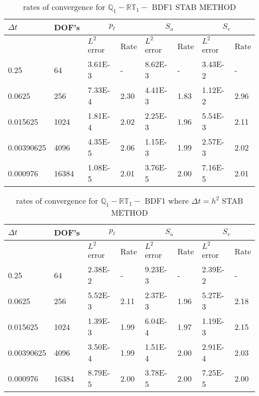 \begin{table}[ht]
	\centering
	\begin{tabular}{|l|l|l|l|l|l|l|l|}
		\hline
		$\Delta t$ & DOF's & \multicolumn{2}{c|}{$p_{\ell}$} & \multicolumn{2}{c|}{$S_a$} & \multicolumn{2}{c|}{$S_v$}  \\ \hline
		& & $L^2$ error & Rate & $L^2$ error & Rate & $L^2$ error & Rate \\ \hline
		0.25   	  & 64    & 3.61E-3 & -	   & 8.62E-3 & -    & 3.43E-2 & - \\ \hline
		0.0625    & 256   & 7.33E-4 & 2.30 & 4.41E-3 & 1.83 & 1.12E-2 & 2.96 \\ \hline
		0.015625  & 1024  & 1.81E-4 & 2.02 & 2.25E-3 & 1.96 & 5.54E-3 & 2.11 \\ \hline
		0.00390625& 4096  & 4.35E-5 & 2.06 & 1.15E-3 & 1.99 & 2.57E-3 & 2.02 \\ \hline 
		0.000976  & 16384 & 1.08E-5 & 2.01 & 3.76E-5 & 2.00 & 7.16E-5 & 2.01  \\ \hline
	\end{tabular}
	\caption[Template table-description for list of tables.]{ rates of convergence for $\mathbb{Q}_1 - \mathbb{RT}_1 -$ BDF1  STAB METHOD }
\end{table}


\begin{table}[ht]
	\centering
	\begin{tabular}{|l|l|l|l|l|l|l|l|}
		\hline
		$\Delta t$ & DOF's & \multicolumn{2}{c|}{$p_{\ell}$} & \multicolumn{2}{c|}{$S_a$} & \multicolumn{2}{c|}{$S_v$}  \\ \hline
		& & $L^2$ error & Rate & $L^2$ error & Rate & $L^2$ error & Rate \\ \hline
		0.25   	  & 64    & 2.38E-2 & -	   & 9.23E-3 & -    & 2.39E-2 & - \\ \hline
		0.0625    & 256   & 5.52E-3 & 2.11 & 2.37E-3 & 1.96 & 5.27E-3 & 2.18 \\ \hline
		0.015625  & 1024  & 1.39E-3 & 1.99 & 6.04E-4 & 1.97 & 1.19E-3 & 2.15 \\ \hline
		0.00390625& 4096  & 3.50E-4 & 1.99 & 1.51E-4 & 2.00 & 2.91E-4 & 2.03 \\ \hline 
		0.000976  & 16384 & 8.79E-5 & 2.00 & 3.78E-5 & 2.00 & 7.25E-5 & 2.00  \\ \hline
	\end{tabular}
	\caption[Template table-description for list of tables.]{ rates of convergence for $\mathbb{Q}_1 - \mathbb{RT}_1-$ BDF1 where $\Delta t = h^2$ STAB METHOD }
\end{table}

